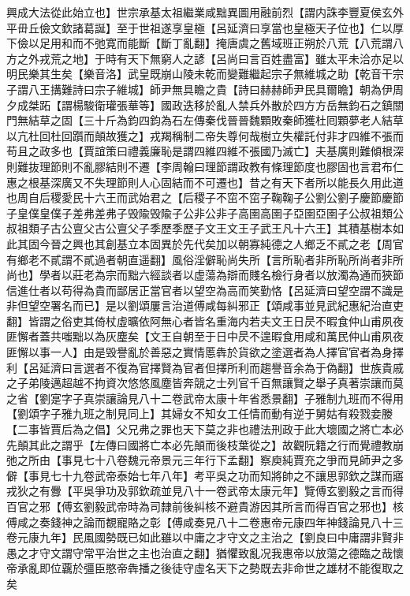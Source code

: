 興成大法從此始立也】世宗承基太祖繼業咸黜異圖用融前烈【謂内誅李豐夏侯玄外平毌丘儉文欽諸葛誕】至于世祖遂享皇極【呂延濟曰享當也皇極天子位也】仁以厚下儉以足用和而不弛寛而能斷【斷丁亂翻】掩唐虞之舊域班正朔於八荒【八荒謂八方之外戎荒之地】于時有天下無窮人之諺【呂尚曰言百姓盡富】雖太平未洽亦足以明民樂其生矣【樂音洛】武皇既崩山陵未乾而變難繼起宗子無維城之助【乾音干宗子謂八王搆難詩曰宗子維城】師尹無具瞻之貴【詩曰赫赫師尹民具爾瞻】朝為伊周夕成桀跖【謂楊駿衛瓘張華等】國政迭移於亂人禁兵外散於四方方岳無鈞石之鎮關門無結草之固【三十斤為鈞四鈞為石左傳秦伐晉晉魏顆敗秦師獲杜囘顆夢老人結草以亢杜回杜回躓而顛故獲之】戎羯稱制二帝失尊何哉樹立失權託付非才四維不張而苟且之政多也【賈誼策曰禮義廉恥是謂四維四維不張國乃滅亡】夫基廣則難傾根深則難抜理節則不亂膠結則不遷【李周翰曰理節謂政教有條理節度也膠固也言君布仁惠之根基深廣又不失理節則人心固結而不可遷也】昔之有天下者所以能長久用此道也周自后稷愛民十六王而武始君之【后稷子不窋不窋子鞠鞠子公劉公劉子慶節慶節子皇僕皇僕子差弗差弗子毁隃毁隃子公非公非子高圉高圉子亞圉亞圉子公叔祖類公叔祖類子古公亶父古公亶父子季歷季歷子文王文王子武王凡十六王】其積基樹本如此其固今晉之興也其創基立本固異於先代矣加以朝寡純德之人鄉乏不貳之老【周官有鄉老不貳謂不貳過者朝直遥翻】風俗淫僻恥尚失所【言所恥者非所恥所尚者非所尚也】學者以莊老為宗而黜六經談者以虚蕩為辯而賤名檢行身者以放濁為通而狹節信進仕者以苟得為貴而鄙居正當官者以望空為高而笑勤恪【呂延濟曰望空謂不識是非但望空署名而已】是以劉頌屢言治道傅咸每糾邪正【頌咸事並見武紀惠紀治直吏翻】皆謂之俗吏其倚杖虛曠依阿無心者皆名重海内若夫文王日昃不暇食仲山甫夙夜匪懈者蓋共嗤黜以為灰塵矣【文王自朝至于日中昃不遑暇食用咸和萬民仲山甫夙夜匪懈以事一人】由是毁譽亂於善惡之實情慝犇於貨欲之塗選者為人擇官官者為身擇利【呂延濟曰言選者不復為官擇賢為官者但擇所利而趨譽音余為于偽翻】世族貴戚之子弟陵邁超越不拘資次悠悠風塵皆奔競之士列官千百無讓賢之舉子真著崇讓而莫之省【劉寔字子真崇讓論見八十二卷武帝太康十年省悉景翻】子雅制九班而不得用【劉頌字子雅九班之制見同上】其婦女不知女工任情而動有逆于舅姑有殺戮妾媵【二事皆賈后為之倡】父兄弗之罪也天下莫之非也禮法刑政于此大壞國之將亡本必先顛其此之謂乎【左傳曰國將亡本必先顛而後枝葉從之】故觀阮籍之行而覺禮教崩弛之所由【事見七十八卷魏元帝景元三年行下孟翻】察庾純賈充之爭而見師尹之多僻【事見七十九卷武帝泰始七年八年】考平吳之功而知將帥之不讓思郭欽之謀而寤戎狄之有釁【平吳爭功及郭欽疏並見八十一卷武帝太康元年】覽傅玄劉毅之言而得百官之邪【傅玄劉毅武帝時為司隸前後糾核不避貴游因其所言而得百官之邪也】核傅咸之奏錢神之論而覩寵賂之彰【傅咸奏見八十二卷惠帝元康四年神錢論見八十三卷元康九年】民風國勢既已如此雖以中庸之才守文之主治之【劉良曰中庸謂非賢非愚之才守文謂守常平治世之主也治直之翻】猶懼致亂况我惠帝以放蕩之德臨之哉懷帝承亂即位覊於彊臣愍帝犇播之後徒守虛名天下之勢既去非命世之雄材不能復取之矣

